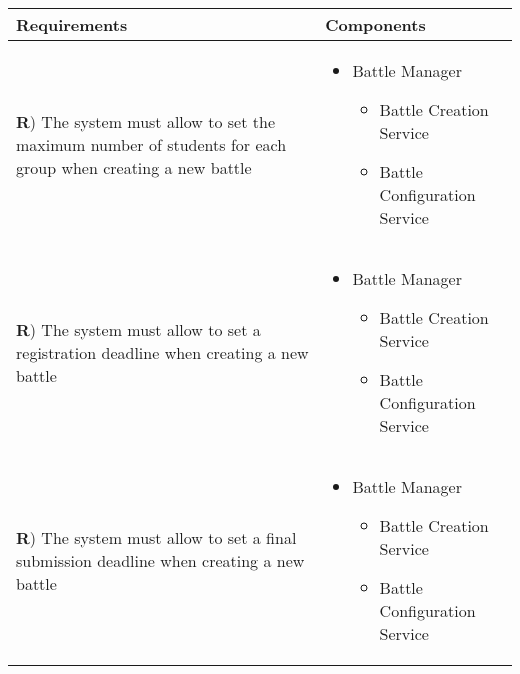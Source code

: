 \documentclass[../DD.tex]{subfiles}
\newcounter{rown}
\newcommand{\rowIndex}{\arabic{rown}\stepcounter{rown}}
\begin{document}
    \begin{table}[h!]
        \begin{center}
            \hspace*{-2cm}
            \begin{tabular}{|m{20em}|m{20em}|}
            \hline
            \textbf{Requirements} & \textbf{Components}\\
            \hline
            \textbf{R\rowIndex}) The system must allow to set the maximum number of students for each group when creating a new battle & \begin{itemize}
                \item Battle Manager
                \begin{itemize}
                    \item Battle Creation Service
                    \item Battle Configuration Service
                \end{itemize} 
            \end{itemize}\\
            \hline
            \textbf{R\rowIndex}) The system must allow to set a registration deadline when creating a new battle & \begin{itemize}
                \item  Battle Manager
                \begin{itemize}
                    \item Battle Creation Service
                    \item Battle Configuration Service
                \end{itemize}
            \end{itemize}\\
            \hline
            \textbf{R\rowIndex}) The system must allow to set a final submission deadline when creating a new battle & \begin{itemize}
                \item  Battle Manager
                \begin{itemize}
                    \item Battle Creation Service
                    \item Battle Configuration Service
                \end{itemize}
            \end{itemize}\\

\end{tabular}
\end{center}
\end{table}
\end{document}
